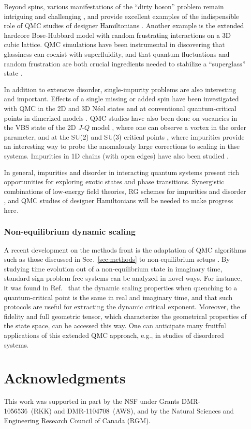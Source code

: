 \documentclass[range]{ar2e}
\begin{document}
Beyond spins, various manifestations of the ``dirty boson'' problem remain intriguing and challenging \cite{Pollet09,Meier12,Iyer12}, and provide excellent 
examples of the indispensible role of QMC studies of designer Hamiltonians \cite{Gurarie09}. Another example is the extended hardcore Bose-Hubbard model with 
random frustrating interactions on a 3D cubic lattice. QMC simulations have been instrumental in discovering that glassiness can coexist with superfluidity, 
and that quantum fluctuations and random frustration are both crucial ingredients needed to stabilize a ``superglass'' state \cite{superglass1,superglass2}.

In addition to extensive disorder, single-impurity problems are also interesting and important. Effects of a single missing or added spin have been
investigated with QMC in the 2D and 3D N\'eel states \cite{Hoglund04} and at conventional quantum-critical points in dimerized models \cite{Hoglund07}. 
QMC studies have also been done on vacancies in the VBS state of the 2D $J$-$Q$ model \cite{Kaul08}, where one can observe a vortex in the order parameter, 
and at the SU($2$) and SU($3$) critical points \cite{banerjee2010:log,banerjee2010:su3}, where impurities provide an interesting way to probe the anomalously 
large corrections to scaling in thse systems. Impurities in 1D chains (with open edges) have also been studied \cite{Sanyal11}.

In general, impurities and disorder in interacting quantum systems present rich opportunities for exploring exotic states and phase transitions.
Synergistic combinations of low-energy field theories, RG schemes for impurities \cite{Vojta12} and disorder \cite{Hoyos08,Vojta10,Altman10,Iyer12}, 
and QMC studies of designer Hamiltonians will be needed to make progress here.

\subsubsection{Non-equilibrium dynamic scaling}

A recent development on the methods front is the adaptation of QMC algorithms such as those discussed in Sec.~\ref{sec:methods} to non-equilibrium 
setups \cite{Degrandi11}. By studying time evolution out of a non-equilibrium state in imaginary time, standard sign-problem free systems
can be analyzed in novel ways. For instance, it was found in Ref.~\cite{Degrandi11} that the dynamic scaling properties when quenching to
a quantum-critical point is the same in real and imaginary time, and that such protocols are useful for extracting the dynamic critical
exponent. Moreover, the fidelity and full geometric tensor, which characterize the geometrical properties of the state space, can be
accessed this way. One can anticipate many fruitful applications of this extended QMC approach, e.g., in studies of disordered systems.

\section*{Acknowledgments}

This work was supported in part by the NSF under Grants DMR-1056536~(RKK) and DMR-1104708~(AWS), and by the Natural Sciences and Engineering Research Council of Canada (RGM).



\end{document}
